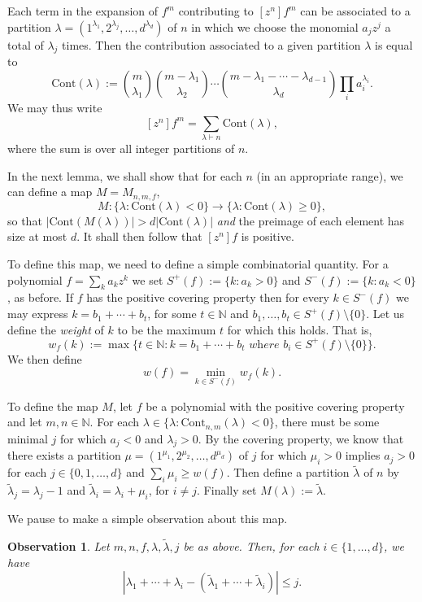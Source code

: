 \documentclass{daj}
\def\l{\lambda}
\def\N{\mathbb{N}}
\newcommand{\Cont}{\mathrm{Cont}}
\newtheorem{observation}[theorem]{Observation}
\theoremstyle{definition}
\theoremstyle{remark}
\begin{document}
Each term in the expansion of $f^m$ contributing to $[z^n] f^m$ can be associated to a partition $\lambda = (1^{\lambda_1},2^{\lambda_j},\ldots,d^{\lambda_d})$ of $n$ in which we choose the monomial $a_jz^j$ a total of $\lambda_j$ times.  Then the contribution associated to a given partition $\lambda$ is equal to 
$$\Cont(\lambda) := \binom{m}{\l_1} \binom{m-\l_1}{\l_2} \cdots \binom{m-\l_1 -\cdots - \l_{d-1}}{\l_d} \prod_i a_i^{\l_i}.$$
 We may thus write \begin{equation}\label{eq:new-anm-cont}
	[z^n] f^m = \sum_{\lambda \vdash n} \Cont(\lambda),
	\end{equation}
	where the sum is over all integer partitions of $n$.
	
	In the next lemma, we shall show that for each $n$ (in an appropriate range), we can define a map $M = M_{n,m,f}$,
	\[ M : \{\l : \Cont(\l) < 0 \} \rightarrow \{ \l : \Cont(\l)\geq 0 \}, \]
so that $|\Cont(M(\l))| > d|\Cont(\l)|$ \emph{and} the preimage of each element has size at most $d$.
It shall then follow that $[z^n]f$ is positive.

To define this map, we need to define a simple combinatorial quantity. For a polynomial
$f = \sum_{k} a_kz^k $ we set $S^+(f) := \{ k : a_k > 0 \}$ and $S^-(f) := \{ k : a_k <0\}$, as before. If $f$ has the positive covering property
then for every $k \in S^-(f)$ we may express $k = b_1 + \cdots + b_{t}$, for some $t\in \N$ and $b_1,\ldots,b_t \in S^+(f)\setminus \{0\}$.
Let us define the \emph{weight} of $k$ to be the maximum $t$ for which this holds. That is, 
\[ w_f(k) := \max\{  t \in \N:  k = b_1 + \cdots + b_t \textit{ where } b_i \in S^+(f)\setminus \{0\} \}. \]
We then define 
\[ w(f) = \min_{k \in S^{-}(f)} w_f(k).\]

To define the map $M$, let $f$ be a polynomial with the positive covering property and let $m,n \in \N$.
For each $\l \in  \{\l : \Cont_{n,m}(\l) < 0 \}$, there must be some minimal $j$ for which $a_j <0$ and $\l_j >0$.
By the covering property, we know that there exists a partition $\mu  = (1^{\mu_1},2^{\mu_2}, \ldots, d^{\mu_d} )$ of $j$ 
for which $\mu_i > 0$ implies $a_j >0$ for each $j \in \{0,1,\ldots,d\}$  and $\sum_{i} \mu_i \geq w(f)$. Then define a partition $\tilde{\l}$ of $n$ by 
$\tilde{\l}_j = \l_j -1$ and $\tilde{\l}_i = \l_i+\mu_i$, for $i \not= j$. Finally set $M(\l) := \tilde{\l}$.

We pause to make a simple observation about this map.

\begin{observation}\label{obs:compression} Let $m,n,f, \l,\tilde{\l}, j$ be as above. Then, for each $i \in \{1,\ldots,d\}$, we have
\[ \left| \l_1 + \cdots + \l_i - \left( \tilde{\l}_1 +\cdots + \tilde{\l}_i\right) \right| \leq j. \]
\end{observation}
\end{document}
